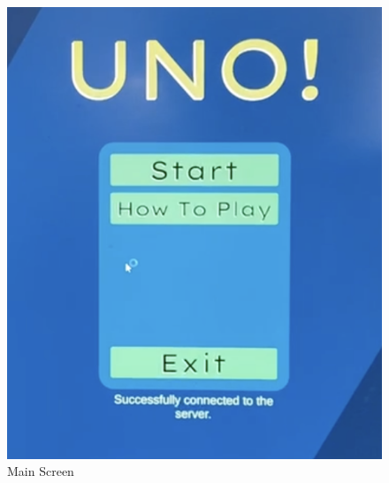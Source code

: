 \documentclass[12pt, titlepage]{article}
\begin{document}
\begin{figure}[h]
    \centering
    \includegraphics[scale=0.4]{main_Screen.png}
    \caption{Main Screen}
    \label{fig:g1}
\end{figure}
\end{document}
